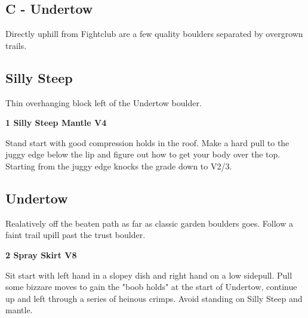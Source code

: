 \begin{multicols}{2}
\newpage


		\section{C - Undertow}\label{sa:Undertow}
	Directly uphill from Fightclub are a few quality boulders separated by overgrown trails.\\

	
	


		\needspace{1.5cm}
		\subsection*{Silly Steep}\label{bf:Silly Steep}
		Thin overhanging block left of the Undertow boulder.\\
	
		
			
			\needspace{1.5cm}
\label{rt:Silly Steep Mantle}
\colorbox{RoyalBlue!20}{
\parbox{0.95\linewidth}{
\textbf{
1 Silly Steep Mantle V4  
}}}

			\begin{adjustwidth}{0.5cm}{}			
			Stand start with good compression holds in the roof. Make a hard pull to the juggy edge below the lip and figure out how to get your body over the top. Starting from the juggy edge knocks the grade down to V2/3.
			\end{adjustwidth}
			
			
		
		
		\needspace{1.5cm}
		\subsection*{Undertow}\label{bf:Undertow}
		Realatively off the beaten path as far as classic garden boulders goes. Follow a faint trail upill past the trust boulder.\\
	
		
			
			\needspace{1.5cm}
\label{rt:Spray Skirt}
\colorbox{Goldenrod!50}{
\parbox{0.95\linewidth}{
\textbf{
2 Spray Skirt V8  
}}}

			\begin{adjustwidth}{0.5cm}{}			
			Sit start with left hand in a slopey dish and right hand on a low sidepull. Pull some bizzare moves to gain the "boob holds" at the start of Undertow, continue up and left through a series of heinous crimps. Avoid standing on Silly Steep and mantle.
			\end{adjustwidth}
			

\end{multicols}
